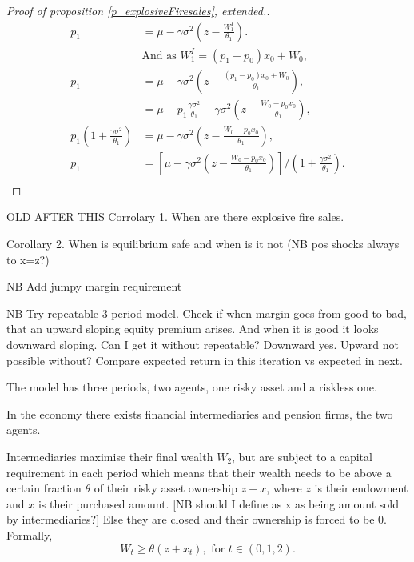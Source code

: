 \documentclass[11pt]{article}
\begin{document}
\begin{appendices}
\begin{proof}[Proof of proposition \ref{p_explosiveFiresales}, extended.]
\begin{align*}
p_1 &= \mu - \gamma\sigma^2 \left(z-\frac{W^I_1}{\theta_1}\right).\\
&\text{And as } W_1^I = (p_1 - p_0)x_0 + W_0,\\
p_1 &= \mu - \gamma\sigma^2 \left(z-\frac{(p_1 - p_0)x_0 + W_0}{\theta_1}\right),\\
 &= \mu - p_1\frac{\gamma\sigma^2}{\theta_1} - \gamma\sigma^2 \left(z-\frac{W_0 - p_0x_0}{\theta_1}\right),\\
p_1(1+\frac{\gamma\sigma^2}{\theta_1}) &= \mu - \gamma\sigma^2 \left(z-\frac{W_0 - p_0x_0}{\theta_1}\right),\\
p_1 &= \left[\mu - \gamma\sigma^2 \left(z-\frac{W_0 - p_0x_0}{\theta_1}\right)\right]/(1+\frac{\gamma\sigma^2}{\theta_1}).\\
\end{align*}
\end{proof}

\newpage
OLD AFTER THIS
Corrolary 1. When are there explosive fire sales.

Corollary 2. When is equilibrium safe and when is it not (NB pos shocks always to x=z?)

\bigbreak

NB Add jumpy margin requirement

NB Try repeatable 3 period model. Check if when margin goes from good to bad, that an upward sloping equity premium arises. And when it is good it looks downward sloping. Can I get it without repeatable? Downward yes. Upward not possible without? Compare expected return in this iteration vs expected in next.

The model has three periods, two agents, one risky asset and a riskless one.

In the economy there exists financial intermediaries and pension firms, the two agents.

Intermediaries maximise their final wealth $W_2$, but are subject to a capital requirement in each period which means that  their wealth needs to be above a certain fraction $\theta$ of their risky asset ownership $z + x$, where $z$ is their endowment and $x$ is their purchased amount. [NB should I define as x as being amount sold by intermediaries?] Else they are closed and their ownership is forced to be 0. Formally,
\begin{equation}
W_t \geq \theta (z + x_t), \text{ for } t \in (0,1,2).
\end{equation} 


\end{appendices}
\end{document}
